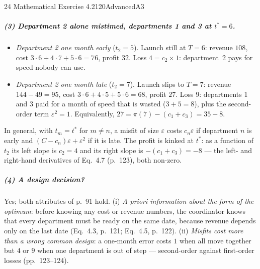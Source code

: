 \begin{exsol}{24}{\MR{} Mathematical Exercise 4.2}{120}{Advanced}{A3}
\subparagraph{(3) Department 2 alone mistimed, departments 1 and 3 at $t^*=6$.}
\begin{itemize}
  \item \emph{Department 2 one month early} ($t_2=5$). Launch still at $T=6$: revenue $108$, cost
    $3\cdot6+4\cdot7+5\cdot6=76$, profit $32$. Loss $4=c_2\times1$: department~2 pays for speed
    nobody can use.
  \item \emph{Department 2 one month late} ($t_2=7$). Launch slips to $T=7$: revenue $144-49=95$,
    cost $3\cdot6+4\cdot5+5\cdot6=68$, profit $27$. Loss $9$: departments 1 and 3 paid for a
    month of speed that is wasted ($3+5=8$), plus the second-order term $\varepsilon^2=1$.
    Equivalently, $27=\pi(7)-(c_1+c_3)=35-8$.
\end{itemize}
In general, with $t_m=t^*$ for $m\ne n$, a misfit of size $\varepsilon$ costs $c_n\varepsilon$ if
department $n$ is early and $(C-c_n)\varepsilon+\varepsilon^2$ if it is late. The profit is kinked
at $t^*$: as a function of $t_2$ its left slope is $c_2=4$ and its right slope is
$-(c_1+c_3)=-8$ --- the left- and right-hand derivatives of Eq.~4.7 (p.~123), both non-zero.

\begin{center}
\end{center}

\subparagraph{(4) A design decision?} Yes; both attributes of p.~91 hold.
(i) \emph{A priori information about the form of the optimum}: before knowing any cost or revenue
numbers, the coordinator knows that every department must be ready on the same date, because
revenue depends only on the last date (Eq.~4.3, p.~121; Eq.~4.5, p.~122).
(ii) \emph{Misfits cost more than a wrong common design}: a one-month error costs $1$ when all
move together but $4$ or $9$ when one department is out of step --- second-order against
first-order losses (pp.~123--124).


\end{exsol}
